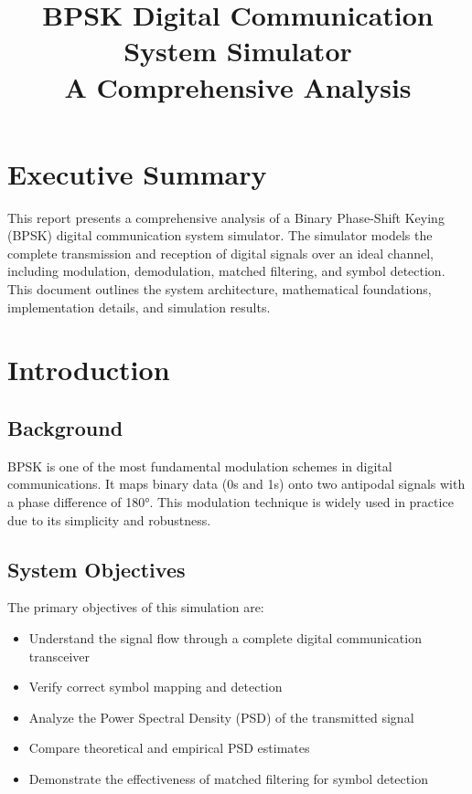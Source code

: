 \documentclass[12pt]{article}
\title{\textbf{BPSK Digital Communication System Simulator} \\ A Comprehensive Analysis}
\author{}
\date{}
\begin{document}
\maketitle

\section{Executive Summary}

This report presents a comprehensive analysis of a Binary Phase-Shift Keying (BPSK) digital communication system simulator. The simulator models the complete transmission and reception of digital signals over an ideal channel, including modulation, demodulation, matched filtering, and symbol detection. This document outlines the system architecture, mathematical foundations, implementation details, and simulation results.

\section{Introduction}

\subsection{Background}

BPSK is one of the most fundamental modulation schemes in digital communications. It maps binary data (0s and 1s) onto two antipodal signals with a phase difference of 180°. This modulation technique is widely used in practice due to its simplicity and robustness.

\subsection{System Objectives}

The primary objectives of this simulation are:
\begin{itemize}
    \item Understand the signal flow through a complete digital communication transceiver
    \item Verify correct symbol mapping and detection
    \item Analyze the Power Spectral Density (PSD) of the transmitted signal
    \item Compare theoretical and empirical PSD estimates
    \item Demonstrate the effectiveness of matched filtering for symbol detection
\end{itemize}
\end{document}
